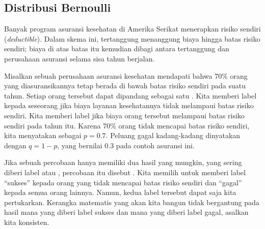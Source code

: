 \subsection{Distribusi Bernoulli}
\label{bernoulli}

\newcommand{\insureSprob}{0.7}
\newcommand{\insureSperc}{70\%}
\newcommand{\insureFprob}{0.3}
\newcommand{\insureFperc}{30\%}
\newcommand{\insureDistA}{0.7}
\newcommand{\insureDistB}{0.21}
\newcommand{\insureDistC}{0.063}
\newcommand{\insureDistD}{0.019}
\newcommand{\insureDistE}{0.006}
\newcommand{\insureCDistA}{0.7}
\newcommand{\insureCDistB}{0.91}
\newcommand{\insureCDistC}{0.973}
\newcommand{\insureCDistCComplement}{0.027}
\newcommand{\insureCDistD}{0.992}
\newcommand{\insureCDistE}{0.998}
\newcommand{\insureGeomMean}{1.43}


Banyak program asuransi kesehatan di Amerika Serikat menerapkan
risiko sendiri (\emph{deductible}). Dalam skema ini, tertanggung menanggung
biaya hingga batas risiko sendiri; biaya di atas batas itu kemudian dibagi
antara tertanggung dan perusahaan asuransi selama sisa tahun berjalan.

Misalkan sebuah perusahaan asuransi kesehatan mendapati bahwa
\insureSperc{} orang yang diasuransikannya tetap berada di bawah batas
risiko sendiri pada suatu tahun. Setiap orang tersebut dapat dipandang sebagai
satu . Kita memberi label
 kepada seseorang jika biaya layanan kesehatannya
tidak melampaui batas risiko sendiri. Kita memberi label
 jika biaya orang tersebut melampaui batas risiko
sendiri pada tahun itu. Karena 70\% orang tidak mencapai batas risiko
sendiri, kita menyatakan 
sebagai $p = \insureSprob{}$. Peluang gagal kadang-kadang dinyatakan dengan
$q = 1 - p$, yang bernilai \insureFprob{} pada contoh asuransi ini.

Jika sebuah percobaan hanya memiliki dua hasil yang mungkin, yang sering
diberi label  atau , percobaan itu disebut
.
Kita memilih untuk memberi label ``sukses'' kepada orang yang tidak
mencapai batas risiko sendiri dan ``gagal'' kepada semua orang lainnya.
Namun, kedua label tersebut dapat saja kita pertukarkan. Kerangka
matematis yang akan kita bangun tidak bergantung pada hasil mana yang
diberi label sukses dan mana yang diberi label gagal, asalkan kita
konsisten.

